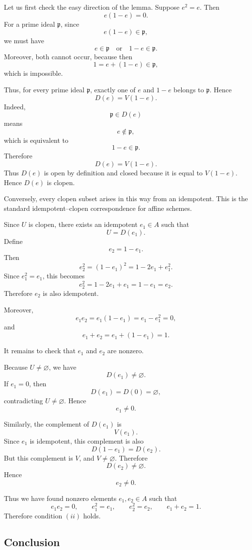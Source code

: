 \documentclass[12pt,a4paper]{article}
\begin{document}
	\medskip
	
	Let us first check the easy direction of the lemma. Suppose \(e^2=e\). Then
	\[
	e(1-e)=0.
	\]
	For a prime ideal \(\mathfrak p\), since
	\[
	e(1-e)\in\mathfrak p,
	\]
	we must have
	\[
	e\in\mathfrak p
	\quad\text{or}\quad
	1-e\in\mathfrak p.
	\]
	Moreover, both cannot occur, because then
	\[
	1=e+(1-e)\in\mathfrak p,
	\]
	which is impossible.
	
	Thus, for every prime ideal \(\mathfrak p\), exactly one of \(e\) and \(1-e\)
	belongs to \(\mathfrak p\). Hence
	\[
	D(e)=V(1-e).
	\]
	Indeed,
	\[
	\mathfrak p\in D(e)
	\]
	means
	\[
	e\notin\mathfrak p,
	\]
	which is equivalent to
	\[
	1-e\in\mathfrak p.
	\]
	Therefore
	\[
	D(e)=V(1-e).
	\]
	Thus \(D(e)\) is open by definition and closed because it is equal to
	\(V(1-e)\). Hence \(D(e)\) is clopen.
	
	Conversely, every clopen subset arises in this way from an idempotent. This is
	the standard idempotent--clopen correspondence for affine schemes.
	
	Since \(U\) is clopen, there exists an idempotent \(e_1\in A\) such that
	\[
	U=D(e_1).
	\]
	Define
	\[
	e_2=1-e_1.
	\]
	Then
	\[
	e_2^2=(1-e_1)^2
	=
	1-2e_1+e_1^2.
	\]
	Since \(e_1^2=e_1\), this becomes
	\[
	e_2^2
	=
	1-2e_1+e_1
	=
	1-e_1
	=
	e_2.
	\]
	Therefore \(e_2\) is also idempotent.
	
	Moreover,
	\[
	e_1e_2=e_1(1-e_1)=e_1-e_1^2=0,
	\]
	and
	\[
	e_1+e_2=e_1+(1-e_1)=1.
	\]
	
	It remains to check that \(e_1\) and \(e_2\) are nonzero.
	
	Because \(U\neq\varnothing\), we have
	\[
	D(e_1)\neq\varnothing.
	\]
	If \(e_1=0\), then
	\[
	D(e_1)=D(0)=\varnothing,
	\]
	contradicting \(U\neq\varnothing\). Hence
	\[
	e_1\neq 0.
	\]
	
	Similarly, the complement of \(D(e_1)\) is
	\[
	V(e_1).
	\]
	Since \(e_1\) is idempotent, this complement is also
	\[
	D(1-e_1)=D(e_2).
	\]
	But this complement is \(V\), and \(V\neq\varnothing\). Therefore
	\[
	D(e_2)\neq\varnothing.
	\]
	Hence
	\[
	e_2\neq 0.
	\]
	
	Thus we have found nonzero elements \(e_1,e_2\in A\) such that
	\[
	e_1e_2=0,
	\qquad
	e_1^2=e_1,
	\qquad
	e_2^2=e_2,
	\qquad
	e_1+e_2=1.
	\]
	Therefore condition \((ii)\) holds.
	
	\subsection*{Conclusion}
	
\end{document}
